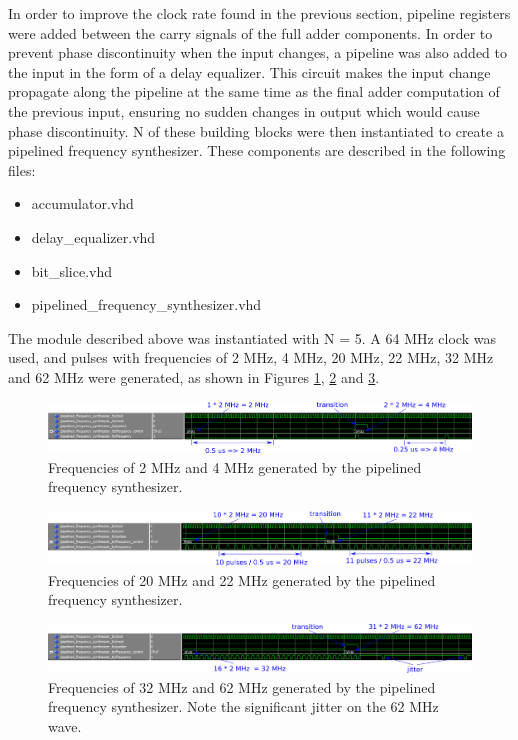 \documentclass[a4paper, 10pt, titlepage]{article}
\begin{document}
In order to improve the clock rate found in the previous section, pipeline registers were added between the carry signals of the full adder components. In order to prevent phase discontinuity when the input changes, a pipeline was also added to the input in the form of a delay equalizer. This circuit makes the input change propagate along the pipeline at the same time as the final adder computation of the previous input, ensuring no sudden changes in output which would cause phase discontinuity. N of these building blocks were then instantiated to create a pipelined frequency synthesizer. These components are described in the following files:
\begin{itemize}
    \item accumulator.vhd
    \item delay\_equalizer.vhd
    \item bit\_slice.vhd
    \item pipelined\_frequency\_synthesizer.vhd
\end{itemize}

The module described above was instantiated with N = 5. A 64 MHz clock was used, and pulses with frequencies of 2 MHz, 4 MHz, 20 MHz, 22 MHz, 32 MHz and 62 MHz were generated, as shown in Figures \ref{fig:pipeline_1}, \ref{fig:pipeline_2} and \ref{fig:pipeline_3}.

\begin{figure}[!htb]
    \centering
    \includegraphics[width=\linewidth]{pipeline_2_4_MHz.PNG}
    \caption{Frequencies of 2 MHz and 4 MHz generated by the pipelined frequency synthesizer.}
    \label{fig:pipeline_1}
\end{figure}
\begin{figure}[!htb]
    \centering
    \includegraphics[width=\linewidth]{pipeline_20_22_MHz.PNG}
    \caption{Frequencies of 20 MHz and 22 MHz generated by the pipelined frequency synthesizer.}
    \label{fig:pipeline_2}
\end{figure}
\begin{figure}[!htb]
    \centering
    \includegraphics[width=\linewidth]{pipeline_32_62_MHz.PNG}
    \caption{Frequencies of 32 MHz and 62 MHz generated by the pipelined frequency synthesizer. Note the significant jitter on the 62 MHz wave.}
    \label{fig:pipeline_3}
\end{figure}
\end{document}
